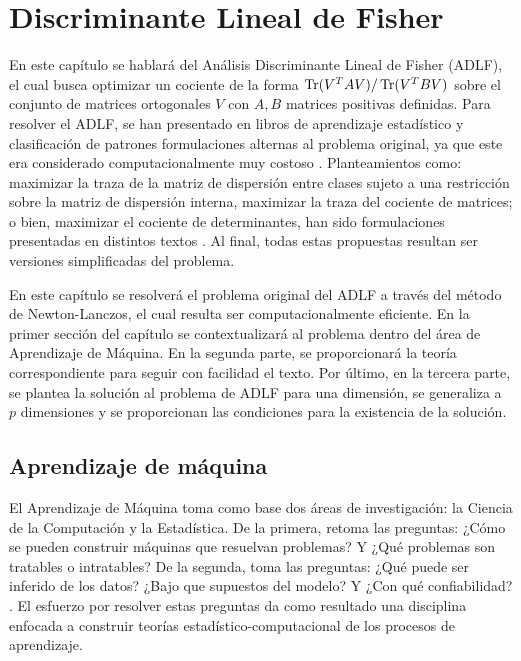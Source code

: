 \chapter{Discriminante Lineal de Fisher}
\label{ch:chapter2}
 
En este capítulo se hablará del Análisis Discriminante Lineal de Fisher (ADLF), el cual busca optimizar un cociente de la forma $\operatorname{Tr}(V^T A V) / \operatorname{Tr}(V^T B V)$ sobre el conjunto de matrices ortogonales $V$ con $A, B$ matrices positivas definidas. Para resolver el ADLF, se han presentado en libros de aprendizaje estadístico y clasificación de patrones formulaciones alternas al problema original, ya que este era considerado computacionalmente muy costoso \cite{wang2007trace}\cite{ngo2012trace}. Planteamientos como: maximizar la traza de la matriz de dispersión entre clases sujeto a una restricción sobre la matriz de dispersión interna, maximizar la traza del cociente de matrices; o bien, maximizar el cociente de determinantes, han sido formulaciones presentadas en distintos textos \cite{duda2012pattern} \cite{hastie2009elements} \cite{mitchell2006discipline} \cite{fukunaga2013introduction}. Al final, todas estas propuestas resultan ser versiones simplificadas del problema.

En este capítulo se resolverá el problema original del ADLF a través del método de Newton-Lanczos, el cual resulta ser computacionalmente eficiente. En la primer sección del capítulo se contextualizará al problema dentro del área de Aprendizaje de Máquina. En la segunda parte, se proporcionará la teoría correspondiente para seguir con facilidad el texto. Por último, en la tercera parte, se plantea la solución al problema de ADLF para una dimensión, se generaliza a $p$ dimensiones y se proporcionan las condiciones para la existencia de la solución.


\section{Aprendizaje de máquina}
El Aprendizaje de Máquina toma como base dos áreas de investigación: la Ciencia de la Computación y la Estadística. De la primera, retoma las preguntas: ¿Cómo se pueden construir máquinas que resuelvan problemas? Y ¿Qué problemas son tratables o intratables? De la segunda, toma las preguntas: ¿Qué puede ser inferido de los datos? ¿Bajo que supuestos del modelo? Y ¿Con qué confiabilidad? \cite{mitchell2006discipline}. El esfuerzo por resolver estas preguntas da como resultado una disciplina enfocada a construir teorías estadístico-computacional de los procesos de aprendizaje.

